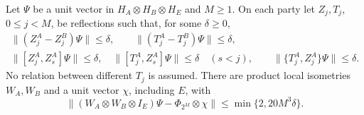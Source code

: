 \begin{theorem}\label{thm:triangular}
Let $\Psi$ be a unit vector in $H_A\otimes H_B\otimes H_E$ and $M\ge1$. On each party let $Z_j,T_j$, $0\le j<M$, be
reflections such that, for some $\delta\ge0$,
\begin{gather*}
\|(Z_j^A-Z_j^B)\Psi\|\le\delta,\qquad\|(T_j^A-T_j^B)\Psi\|\le\delta,\\
\|[Z_j^A,Z_s^A]\Psi\|\le\delta,\quad\|[T_j^A,Z_s^A]\Psi\|\le\delta\quad(s<j),\qquad\|\{T_j^A,Z_j^A\}\Psi\|\le\delta .
\end{gather*}
No relation between different $T_j$ is assumed. There are product local isometries $W_A,W_B$ and a unit vector $\chi$,
including $E$, with
\[
\|(W_A\otimes W_B\otimes I_E)\Psi-\Phi_{2^M}\otimes\chi\|\le\min\{2,20M^3\delta\}.
\]
\end{theorem}

